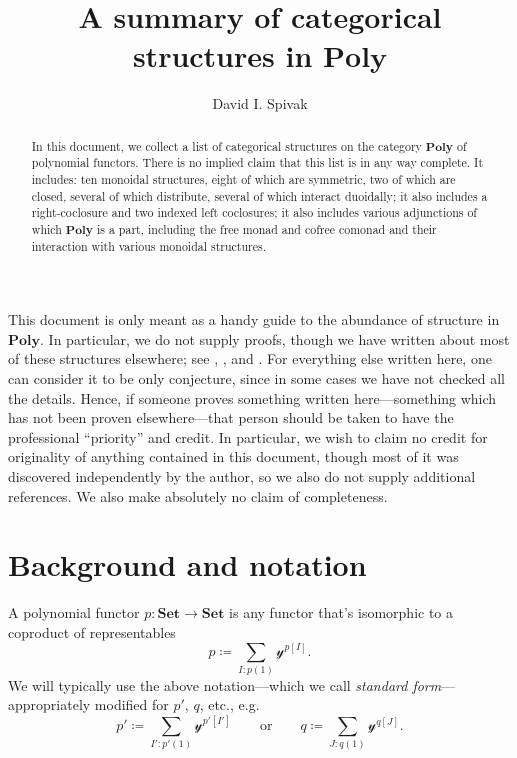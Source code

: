 \documentclass[11pt, one side, article]{memoir}
\theoremstyle{definition}
\theoremstyle{plain}
\newcommand{\Cat}[1]{\mathbf{#1}}%
\newcommand{\smset}{\Cat{Set}}
\newcommand{\yon}{\mathcal{y}}
\newcommand{\poly}{\Cat{Poly}}
\newcommand{\0}{\textsf{0}}
\newcommand{\1}{\tn{\textsf{1}}}
\newcommand{\qqor}{\qquad\text{or}\qquad}
\begin{document}
\title{A summary of categorical structures in $\poly$}

\author{David I. Spivak}


\maketitle

\begin{abstract}
In this document, we collect a list of categorical structures on the category $\poly$ of polynomial functors. There is no implied claim that this list is in any way complete. It includes: ten monoidal structures, eight of which are symmetric, two of which are closed, several of which distribute, several of which interact duoidally; it also includes a right-coclosure and two indexed left coclosures; it also includes various adjunctions of which $\poly$ is a part, including the free monad and cofree comonad and their interaction with various monoidal structures. 
\end{abstract}


\tableofcontents*
\bigskip

This document is only meant as a handy guide to the abundance of structure in $\poly$. In particular, we do not supply proofs, though we have written about most of these structures elsewhere; see \cite{spivak2022poly}, \cite{spivak2021functorial}, and \cite{spivak2022polynomial}. For everything else written here, one can consider it to be only conjecture, since in some cases we have not checked all the details. Hence, if someone proves something written here---something which has not been proven elsewhere---that person should be taken to have the professional ``priority'' and credit. In particular, we wish to claim no credit for originality of anything contained in this document, though most of it was discovered independently by the author, so we also do not supply additional references. We also make absolutely no claim of completeness.

\chapter{Background and notation}

A polynomial functor $p\colon\smset\to\smset$ is any functor that's isomorphic to a coproduct of representables
\[
p\coloneqq\sum_{I: p(1)}\yon^{p[I]}.
\]
We will typically use the above notation---which we call \emph{standard form}---appropriately modified for $p'$, $q$, etc., e.g.
\[
p'\coloneqq\sum_{I': p'(1)}\yon^{p'[I']}
\qqor
q\coloneqq\sum_{J: q(1)}\yon^{q[J]}.
\]
\end{document}
